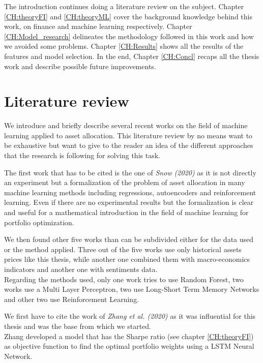 \hfill \break

The introduction continues doing a literature review on the subject. Chapter \ref{CH:theoryFI} and \ref{CH:theoryML} cover the background knowledge behind this work, on finance and machine learning respectively. Chapter \ref{CH:Model_research} delineates the methodology followed in this work and how we avoided some problems. Chapter \ref{CH:Results} shows all the results of the features and model selection. In the end, Chapter \ref{CH:Concl} recaps all the thesis work and describe possible future improvements. 

\section{Literature review}
\label{literature_review}

We introduce and briefly describe several recent works on the field of machine learning applied to asset allocation. This literature review by no means want to be exhaustive but want to give to the reader an idea of the different approaches that the research is following for solving this task.

The first work that has to be cited is the one of \textit{Snow (2020)} \cite{snow2020machine} as it is not directly an experiment but a formalization of the problem of asset allocation in many machine learning methods including regressions, autoencoders and reinforcement learning. Even if there are no experimental results but the formalization is clear and useful for a mathematical introduction in the field of machine learning for portfolio optimization.

\hfill \break

We then found other five works than can be subdivided either for the data used or the method applied. Three out of the five works use only historical assets prices like this thesis, while another one combined them with macro-economics indicators and another one with sentiments data. \\
Regarding the methods used, only one work tries to use Random Forest, two works use a Multi Layer Perceptron, two use Long-Short Term Memory Networks and other two use Reinforcement Learning.

\hfill \break

We first have to cite the work of \textit{Zhang et al. (2020)} \cite{Zhang_2020} as it was influential for this thesis and was the base from which we started. \\
Zhang developed a model that has the Sharpe ratio (see chapter \ref{CH:theoryFI}) as objective function to find the optimal portfolio weights using a LSTM Neural Network. 

